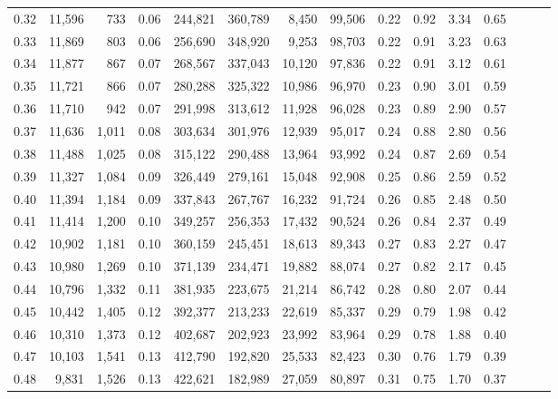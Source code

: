 \begin{tabular}{rrrrrrrrrrrrrrr}
0.32 &  11,596 &    733 &  0.06 &  244,821 &  360,789 &    8,450 &   99,506 &  0.22 &  0.92 &  3.34 &      0.65 \\
0.33 &  11,869 &    803 &  0.06 &  256,690 &  348,920 &    9,253 &   98,703 &  0.22 &  0.91 &  3.23 &      0.63 \\
0.34 &  11,877 &    867 &  0.07 &  268,567 &  337,043 &   10,120 &   97,836 &  0.22 &  0.91 &  3.12 &      0.61 \\
0.35 &  11,721 &    866 &  0.07 &  280,288 &  325,322 &   10,986 &   96,970 &  0.23 &  0.90 &  3.01 &      0.59 \\
0.36 &  11,710 &    942 &  0.07 &  291,998 &  313,612 &   11,928 &   96,028 &  0.23 &  0.89 &  2.90 &      0.57 \\
0.37 &  11,636 &  1,011 &  0.08 &  303,634 &  301,976 &   12,939 &   95,017 &  0.24 &  0.88 &  2.80 &      0.56 \\
0.38 &  11,488 &  1,025 &  0.08 &  315,122 &  290,488 &   13,964 &   93,992 &  0.24 &  0.87 &  2.69 &      0.54 \\
0.39 &  11,327 &  1,084 &  0.09 &  326,449 &  279,161 &   15,048 &   92,908 &  0.25 &  0.86 &  2.59 &      0.52 \\
0.40 &  11,394 &  1,184 &  0.09 &  337,843 &  267,767 &   16,232 &   91,724 &  0.26 &  0.85 &  2.48 &      0.50 \\
0.41 &  11,414 &  1,200 &  0.10 &  349,257 &  256,353 &   17,432 &   90,524 &  0.26 &  0.84 &  2.37 &      0.49 \\
0.42 &  10,902 &  1,181 &  0.10 &  360,159 &  245,451 &   18,613 &   89,343 &  0.27 &  0.83 &  2.27 &      0.47 \\
0.43 &  10,980 &  1,269 &  0.10 &  371,139 &  234,471 &   19,882 &   88,074 &  0.27 &  0.82 &  2.17 &      0.45 \\
0.44 &  10,796 &  1,332 &  0.11 &  381,935 &  223,675 &   21,214 &   86,742 &  0.28 &  0.80 &  2.07 &      0.44 \\
0.45 &  10,442 &  1,405 &  0.12 &  392,377 &  213,233 &   22,619 &   85,337 &  0.29 &  0.79 &  1.98 &      0.42 \\
0.46 &  10,310 &  1,373 &  0.12 &  402,687 &  202,923 &   23,992 &   83,964 &  0.29 &  0.78 &  1.88 &      0.40 \\
0.47 &  10,103 &  1,541 &  0.13 &  412,790 &  192,820 &   25,533 &   82,423 &  0.30 &  0.76 &  1.79 &      0.39 \\
0.48 &   9,831 &  1,526 &  0.13 &  422,621 &  182,989 &   27,059 &   80,897 &  0.31 &  0.75 &  1.70 &      0.37 \\

\end{tabular}

